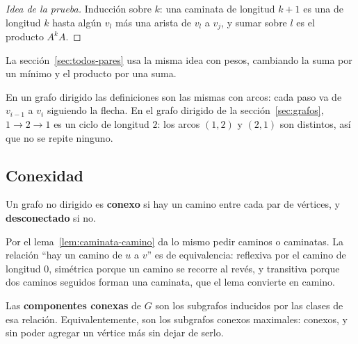 \documentclass[11pt,letterpaper]{article}
\begin{document}
\begin{proof}[Idea de la prueba]
  Inducción sobre $k$: una caminata de longitud $k + 1$ es una de
  longitud $k$ hasta algún $v_l$ más una arista de $v_l$ a $v_j$, y
  sumar sobre $l$ es el producto $A^{k} A$.
\end{proof}

La sección~\ref{sec:todos-pares} usa la misma idea con pesos, cambiando
la suma por un mínimo y el producto por una suma.

En un grafo dirigido las definiciones son las mismas con arcos: cada
paso va de $v_{i-1}$ a $v_i$ siguiendo la flecha. En el grafo dirigido
de la sección~\ref{sec:grafos}, $1 \to 2 \to 1$ es un ciclo de
longitud $2$: los arcos $(1, 2)$ y $(2, 1)$ son distintos, así que no
se repite ninguno.


\subsection*{Conexidad}

\begin{definicion}[Conexo]
  \label{def:conexo}
  Un grafo no dirigido es \textbf{conexo} si hay un camino entre cada
  par de vértices, y \textbf{desconectado} si no.
\end{definicion}

Por el lema~\ref{lem:caminata-camino} da lo mismo pedir caminos o
caminatas. La relación ``hay un camino de $u$ a $v$'' es de
equivalencia: reflexiva por el camino de longitud $0$, simétrica
porque un camino se recorre al revés, y transitiva porque dos caminos
seguidos forman una caminata, que el lema convierte en camino.

\begin{definicion}
  \label{def:componente-conexa}
  Las \textbf{componentes conexas} de $G$ son los subgrafos inducidos
  por las clases de esa relación. Equivalentemente, son los subgrafos
  conexos maximales: conexos, y sin poder agregar un vértice más sin
  dejar de serlo.
\end{definicion}
\end{document}
